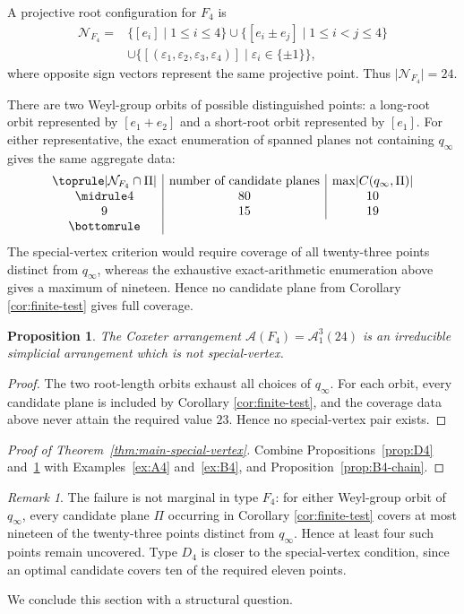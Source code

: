 \documentclass[11pt]{article}
\newtheorem{proposition}[theorem]{Proposition}
\theoremstyle{definition}
\theoremstyle{remark}
\newtheorem{remark}[theorem]{Remark}
\newcommand{\cA}{\mathcal A}
\newcommand{\cN}{\mathcal N}
\newcommand{\card}[1]{\lvert #1\rvert}
\begin{document}
A projective root configuration for $F_4$ is
\[
 \begin{split}
 \cN_{F_4}={}&\{[e_i]\mid1\leq i\leq4\}
 \cup\{[e_i\pm e_j]\mid1\leq i<j\leq4\}\\
 &\cup
 \{[(\varepsilon_1,\varepsilon_2,\varepsilon_3,\varepsilon_4)]
 \mid \varepsilon_i\in\{\pm1\}\},
 \end{split}
\]
where opposite sign vectors represent the same projective point.  Thus
$\card{\cN_{F_4}}=24$.

There are two Weyl-group orbits of possible distinguished points: a
long-root orbit represented by $[e_1+e_2]$ and a short-root orbit represented
by $[e_1]$.  For either representative, the exact enumeration of spanned
planes not containing $q_\infty$ gives the same aggregate data:
\[
\begin{array}{c|c|c}
\toprule
\card{\cN_{F_4}\cap\Pi}&\text{number of candidate planes}&
\max\card{C(q_\infty,\Pi)}\\
\midrule
4&80&10\\
9&15&19\\
\bottomrule
\end{array}
\]
The special-vertex criterion would require coverage of all twenty-three
points distinct from $q_\infty$, whereas the exhaustive exact-arithmetic
enumeration above gives a maximum of nineteen.  Hence no candidate plane
from Corollary \ref{cor:finite-test} gives full coverage.

\begin{proposition}\label{prop:F4}
The Coxeter arrangement $\cA(F_4)=\cA^3_1(24)$ is an irreducible simplicial
arrangement which is not special-vertex.
\end{proposition}

\begin{proof}
The two root-length orbits exhaust all choices of $q_\infty$.  For each
orbit, every candidate plane is included by Corollary \ref{cor:finite-test}, and the
coverage data above never attain the required value $23$.  Hence no
special-vertex pair exists.
\end{proof}

\begin{proof}[Proof of Theorem~\ref{thm:main-special-vertex}]
Combine Propositions~\ref{prop:D4} and~\ref{prop:F4} with Examples~\ref{ex:A4} and~\ref{ex:B4}, and Proposition~\ref{prop:B4-chain}.
\end{proof}

\begin{remark}\label{rem:proper}
The failure is not marginal in type $F_4$: for either Weyl-group orbit of
$q_\infty$, every candidate plane $\Pi$ occurring in Corollary
\ref{cor:finite-test} covers at most nineteen of the twenty-three points
distinct from $q_\infty$.  Hence at least four such points remain
uncovered.  Type $D_4$ is closer to the special-vertex condition, since an
optimal candidate covers ten of the required eleven points.
\end{remark}
We conclude this section with a structural question.
\end{document}
